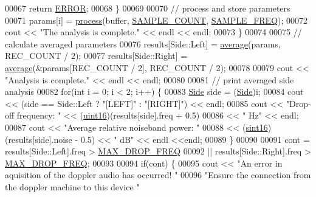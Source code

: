 \begin{DoxyCode}
00067                 \textcolor{keywordflow}{return} \hyperlink{definitions_8hpp_a876fcacb67d51738e846a3312dc08fbb}{ERROR};
00068             \}
00069 
00070             \textcolor{comment}{// process and store parameters}
00071             params[i] = \hyperlink{namespaceavda_a5196cce27286d08ca144a460caee7839}{process}(buffer, \hyperlink{definitions_8hpp_ad3af99f5e7cbf2af51be580e91faa934}{SAMPLE\_COUNT}, 
      \hyperlink{definitions_8hpp_a8ace559345ecba7978591ac2ef22aea4}{SAMPLE\_FREQ});
00072             cout << \textcolor{stringliteral}{"The analysis is complete."} << endl << endl;
00073         \}
00074 
00075         \textcolor{comment}{// calculate averaged parameters}
00076         results[Side::Left] = \hyperlink{namespaceavda_a2a830f24a59aa2538ea82f6e000cce61}{average}(params, REC\_COUNT / 2);
00077         results[Side::Right] = \hyperlink{namespaceavda_a2a830f24a59aa2538ea82f6e000cce61}{average}(&params[REC\_COUNT / 2], REC\_COUNT / 2);
00078 
00079         cout << \textcolor{stringliteral}{"Analysis is complete."} << endl << endl;
00080 
00081         \textcolor{comment}{// print averaged side analysis}
00082         \textcolor{keywordflow}{for}(\textcolor{keywordtype}{int} i = 0; i < 2; i++) \{
00083             \hyperlink{namespaceavda_af723e82f0d3d45fda6fdc01f6a492786}{Side} side = (\hyperlink{namespaceavda_af723e82f0d3d45fda6fdc01f6a492786}{Side})i;
00084             cout << (side == Side::Left ? \textcolor{stringliteral}{"[LEFT]"} : \textcolor{stringliteral}{"[RIGHT]"}) << endl;
00085             cout << \textcolor{stringliteral}{"Drop-off frequency: "} << (\hyperlink{definitions_8hpp_a05f6b0ae8f6a6e135b0e290c25fe0e4e}{uint16})(results[side].freq + 0.5)
00086                 << \textcolor{stringliteral}{" Hz"} << endl;
00087             cout << \textcolor{stringliteral}{"Average relative noiseband power: "}
00088                 << (\hyperlink{definitions_8hpp_a74df79fde3c518e55b29ce6360a9c76e}{sint16})(results[side].noise - 0.5) << \textcolor{stringliteral}{" dB"} << endl <<endl;
00089         \}
00090 
00091         cont = results[Side::Left].freq > \hyperlink{definitions_8hpp_ab506614aee9be52f401d8d573a8d172c}{MAX\_DROP\_FREQ}
00092             || results[Side::Right].freq > \hyperlink{definitions_8hpp_ab506614aee9be52f401d8d573a8d172c}{MAX\_DROP\_FREQ};
00093 
00094         \textcolor{keywordflow}{if}(cont) \{
00095             cout << \textcolor{stringliteral}{"An error in aquisition of the doppler audio has occurred! "}
00096                 \textcolor{stringliteral}{"Ensure the connection from the doppler machine to this device "}

\end{DoxyCode}
